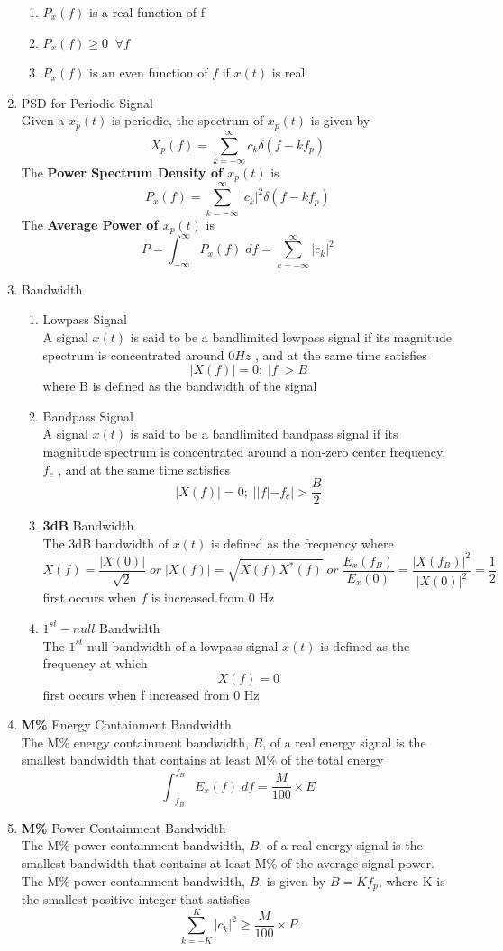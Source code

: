 \documentclass{article}
\begin{document}
\begin{enumerate}
        \begin{enumerate}
            \item $P_x(f)$ is a real function of f
            \item $P_x(f) \geq 0 \;\; \forall f$
            \item $P_x(f)$ is an even function of $f$ if $x(t)$ is real
        \end{enumerate}
    \item PSD for Periodic Signal\\
    Given a $x_p(t)$ is periodic, the spectrum of $x_p(t)$ is given by
    \[X_p(f) = \sum^{\infty}_{k=-\infty}c_k\delta(f-kf_p)\]
    The \textbf{Power Spectrum Density of $x_p(t)$} is
    \[P_x(f) = \sum^{\infty}_{k=-\infty}|c_k|^2\delta(f-kf_p) \]
    The \textbf{Average Power of $x_p(t)$} is 
    \[P = \int^{\infty}_{-\infty}P_x(f)\;df = \sum^{\infty}_{k=-\infty}|c_k|^2\]
    \item Bandwidth
    \begin{enumerate}
        \item Lowpass Signal\\
        A signal $x(t)$ is said to be a bandlimited lowpass signal if its magnitude spectrum is concentrated around $0 Hz$ , and at the same time satisfies
        \[|X(f)| = 0 ; \; |f| > B\]
        where B is defined as the bandwidth of the signal
        \item Bandpass Signal \\
        A signal $x(t)$ is said to be a bandlimited bandpass signal if its magnitude spectrum is concentrated around a non-zero center frequency, $f_c$ , and at the same time satisfies
        \[|X(f)| = 0 ; \; ||f| -f_c|> \frac{B}{2}\]
        \item \textbf{3dB} Bandwidth \\
        The 3dB bandwidth of $x(t)$ is defined as the frequency where 
        \[X(f) = \frac{|X(0)|}{\sqrt{2}}\; or \; |X(f)| = \sqrt{X(f)X^*(f)} \; or \; \frac{E_x(f_B)}{E_x(0)} = \frac{|X(f_B)|^2}{|X(0)|^2} = \frac{1}{2}\]
        first occurs when $f$ is increased from 0 Hz
        \item \textbf{$1^{st}-null$} Bandwidth \\
        The $1^{st}$-null bandwidth of a lowpass signal $x(t)$ is defined as the frequency at which 
        \[X(f) = 0\]
        first occurs when f increased from 0 Hz
    \end{enumerate}
    \item \textbf{M\%} Energy Containment Bandwidth \\
    The M\% energy containment bandwidth, $B$, of a real energy signal is the smallest bandwidth that contains at least M\% of the total energy 
    \[\int^{f_B}_{-f_B}E_x(f)\;df = \frac{M}{100}\times E\]
    \item \textbf{M\%} Power Containment Bandwidth \\
    The M\% power containment bandwidth, $B$, of a real energy signal is the smallest bandwidth that contains at least M\% of the average signal power. The M\% power containment bandwidth, $B$, is given by $B = Kf_p$, where K is the smallest positive integer that satisfies 
    \[\sum^{K}_{k=-K}|c_k|^2\geq\frac{M}{100}\times P\]
\end{enumerate}
\newpage
\end{document}

